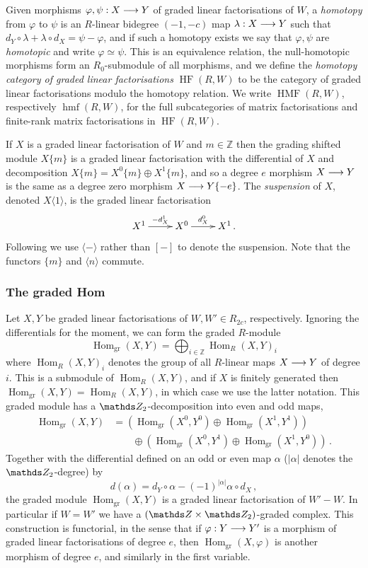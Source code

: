 \documentclass{compositio}
\theoremstyle{definition}
\numberwithin{equation}{section}
\def\Hom{\operatorname{Hom}}
\DeclareMathOperator{\hmf}{hmf}
\DeclareMathOperator{\HMF}{HMF}
\DeclareMathOperator{\HF}{HF}
\begin{document}
Given morphisms $\varphi, \psi: X \longrightarrow Y$ of graded linear factorisations of $W$, a \emph{homotopy} from $\varphi$ to $\psi$ is an $R$-linear bidegree $(-1,-c)$ map $\lambda: X \longrightarrow Y$ such that $d_Y \circ \lambda + \lambda \circ d_X = \psi - \varphi$, and if such a homotopy exists we say that $\varphi, \psi$ are \emph{homotopic} and write $\varphi \simeq \psi$. This is an equivalence relation, the null-homotopic morphisms form an $R_0$-submodule of all morphisms, and we define the \emph{homotopy category of graded linear factorisations} $\HF(R,W)$ to be the category of graded linear factorisations modulo the homotopy relation. We write $\HMF(R,W)$, respectively $\hmf(R,W)$, for the full subcategories of matrix factorisations and finite-rank matrix factorisations in $\HF(R,W)$. 

If $X$ is a graded linear factorisation of $W$ and $m \in \mathds{Z}$ then the grading shifted module $X\{ m \}$ is a graded linear factorisation with the differential of $X$ and decomposition $X\{ m \} = X^0\{ m \} \oplus X^1\{ m \}$, and so a degree $e$ morphism $X \longrightarrow Y$ is the same as a degree zero morphism $X \longrightarrow Y\{-e\}$. The \emph{suspension} of $X$, denoted $X\langle 1 \rangle$, is the graded linear factorisation
\[
\xymatrix{
X^1 \ar[r]^-{-d_X^1} & X^0 \ar[r]^-{d_X^0} & X^1\,.
}
\]
Following \cite{kr0401268} we use $\langle - \rangle$ rather than $[-]$ to denote the suspension. Note that the functors $\{ m \}$ and $\langle n \rangle$ commute.

\subsubsection{The graded Hom} Let $X,Y$ be graded linear factorisations of $W,W' \in R_{2c}$, respectively. Ignoring the differentials for the moment, we can form the graded $R$-module
\[
\Hom_{\text{gr}}(X,Y) = \bigoplus_{i \in \mathds{Z}} \Hom_R(X,Y)_i
\]
where $\Hom_R(X,Y)_i$ denotes the group of all $R$-linear maps $X \longrightarrow Y$ of degree $i$. This is a submodule of $\Hom_R(X,Y)$, and if $X$ is finitely generated then $\Hom_{\text{gr}}(X,Y) = \Hom_R(X,Y)$, in which case we use the latter notation. This graded module has a $\Ztwo$-decomposition into even and odd maps, 
\begin{align*}
\Hom_{\text{gr}}(X,Y) &= \left( \Hom_{\text{gr}}(X^0, Y^0) \oplus \Hom_{\text{gr}}(X^1, Y^1) \right)\\
&\qquad \oplus \left( \Hom_{\text{gr}}(X^0, Y^1) \oplus \Hom_{\text{gr}}(X^1, Y^0) \right)\,.
\end{align*}
Together with the differential defined on an odd or even map $\alpha$ ($|\alpha|$ denotes the $\Ztwo$-degree) by
\[
d(\alpha) = d_Y \circ \alpha - (-1)^{|\alpha|} \alpha \circ d_X \, ,
\]
the graded module $\Hom_{\text{gr}}(X,Y)$ is a graded linear factorisation of $W' - W$. In particular if $W = W'$ we have a $(\ZZ \times \Ztwo)$-graded complex. This construction is functorial, in the sense that if $\varphi: Y \longrightarrow Y'$ is a morphism of graded linear factorisations of degree $e$, then $\Hom_{\text{gr}}(X,\varphi)$ is another morphism of degree $e$, and similarly in the first variable.
\end{document}
